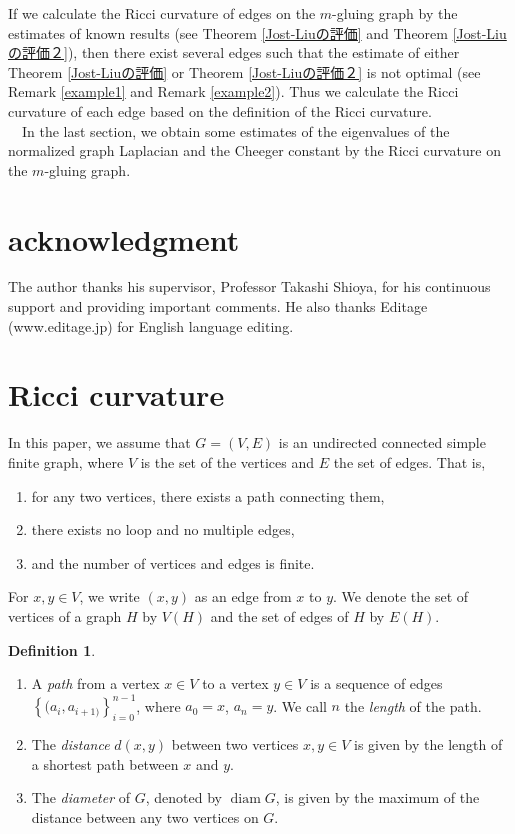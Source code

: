 \documentclass[leqno,12pt]{amsart} %
\theoremstyle{plain} %
\theoremstyle{definition} %
\newtheorem{definition}[theorem]{\indent\sc Definition}
\DeclareMathOperator{\diam}{diam}
\begin{document}
If we calculate the Ricci curvature of edges on the $m$-gluing graph by the estimates of known results (see Theorem \ref{Jost-Liuの評価} and Theorem \ref{Jost-Liuの評価２}), then there exist several edges such that the estimate of either Theorem \ref{Jost-Liuの評価} or Theorem \ref{Jost-Liuの評価２} is not optimal (see Remark \ref{example1} and Remark \ref{example2}). Thus we calculate the Ricci curvature of each edge based on the definition of the Ricci curvature.\\
　In the last section, we obtain some estimates of the eigenvalues of the normalized graph Laplacian and the Cheeger constant by the Ricci curvature on the $m$-gluing graph.

\section*{acknowledgment} 
The author thanks his supervisor, Professor Takashi Shioya, for his continuous support and providing important comments. He also thanks Editage (www.editage.jp) for English language editing.

\section{Ricci curvature}
In this paper, we assume that $G=(V, E)$ is an undirected connected simple finite graph, where $V$ is the set of the vertices and $E$ the set of edges. That is,
	\begin{enumerate}
	\item for any two vertices, there exists a path connecting them,
	\item there exists no loop and no multiple edges,
	\item and the number of vertices and edges is finite.
	\end{enumerate}
For $x, y \in V$, we write $(x, y)$ as an edge from $x$ to $y$. We denote the set of vertices of a graph $H$ by $V(H)$ and the set of edges of $H$ by $E(H)$.

\begin{definition}
	\begin{enumerate}
  	\renewcommand{\labelenumi}{(\arabic{enumi})}
	\item A {\em path} from a vertex $x \in V$ to a vertex $y \in V$ is a sequence of edges $\left\{(a_{i}, a_{i+1)} \right\}_{i=0}^{n-1}$, where $a_{0} = x$, $a_{n} = y$. We call $n$ the {\em length} of the path.
   	\item The {\em distance} $d(x, y)$ between two vertices $x, y \in V$ is given by the length of a shortest path between $x$ and $y$.
	\item The {\em diameter} of $G$, denoted by $\diam G$, is given by the maximum of the distance between any two vertices on $G$.
   	\end{enumerate}
\end{definition}
\end{document}
